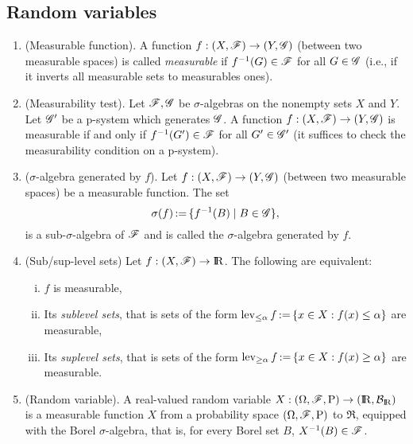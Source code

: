 \documentclass[a4paper,10pt]{article}
\begin{document}
\subsection{Random variables}\label{sec:random_variables}
\begin{enumerate}

 \item (Measurable function). A function $f:(X,\mathscr{F})\to (Y,\mathscr{G})$ (between two measurable spaces) is 
       called \textit{measurable} if $f^{-1}(G) \in \mathscr{F}$ for all $G\in\mathscr{G}$ (i.e., if it inverts all 
       measurable sets to measurables ones).
       
 \item (Measurability test). Let $\mathscr{F},\mathscr{G}$ be $\sigma$-algebras on the nonempty sets $X$ and $Y$. Let $\mathscr{G}'$ be 
       a p-system which generates $\mathscr{G}$. A function $f: (X,\mathscr{F})\to (Y,\mathscr{G})$ is measurable 
       if and only if $f^{-1}(G')\in \mathscr{F}$ for all $G'\in\mathscr{G}'$ (it suffices to check the 
       measurability condition on a p-system).
       
 \item ($\sigma$-algebra generated by $f$). Let $f:(X,\mathscr{F})\to (Y,\mathscr{G})$ (between two measurable spaces) be a measurable
       function. The set 
       \[
        \sigma(f) {}\mathop{\mathrel{:}=}{} \{f^{-1}(B){}\mid{} B\in \mathscr{G}\},
       \]
       is a sub-$\sigma$-algebra of $\mathscr{F}$ and is called the $\sigma$-algebra generated by $f$.
 
 \item (Sub/sup-level sets) Let $f:(X,\F)\to \Re$. The following are equivalent:
      \begin{enumerate}[(i)]
       \item $f$ is measurable,
       \item Its \textit{sublevel sets}, that is
       sets of the form $\operatorname{lev}_{\leq \alpha} f {}\mathop{\mathrel{:}=}{} \{x\in X: f(x) \leq \alpha\}$ are measurable,
	\item Its \textit{suplevel sets},
       that is sets of the form $\operatorname{lev}_{ \geq \alpha} f {}\mathop{\mathrel{:}=}{} \{x\in X: f(x) \geq \alpha \}$ are 
       measurable. 
      \end{enumerate}

       
 \item \label{rv220000}
       (Random variable).
       A real-valued random variable $X:\ofp \to (\Re, \B_\Re)$ is a measurable function $X$
       from a probability space $(\Omega,\mathscr{F},\mathrm{P})$ to $\Re$, equipped with the Borel $\sigma$-algebra, that is, 
       for every Borel set $B$, $X^{-1}(B)\in\mathscr{F}$.              
       

\end{enumerate}
\end{document}
